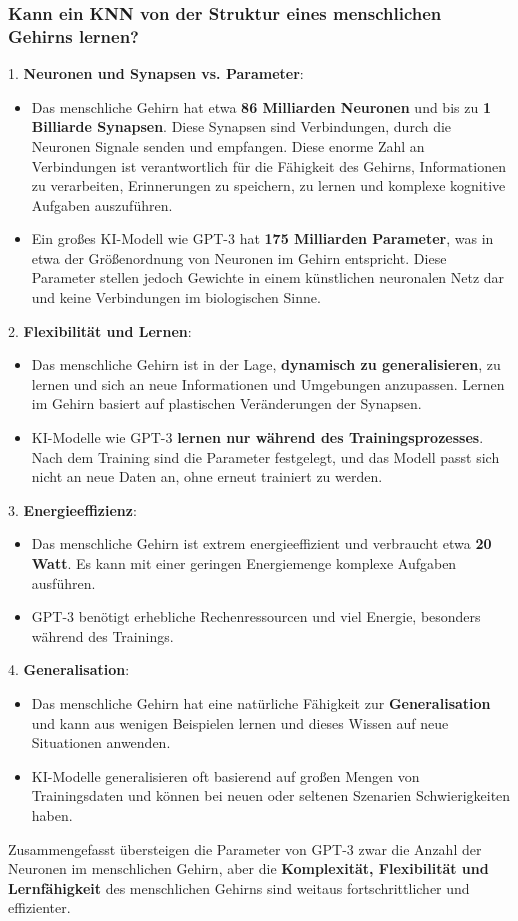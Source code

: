 \documentclass[12pt]{article}
\begin{document}
\subsubsection{Kann ein KNN von der Struktur eines menschlichen Gehirns lernen?} 
1. \textbf{Neuronen und Synapsen vs. Parameter}:
   \begin{itemize}
       \item Das menschliche Gehirn hat etwa \textbf{86 Milliarden Neuronen} und bis zu \textbf{1 Billiarde Synapsen}. Diese Synapsen sind Verbindungen, durch die Neuronen Signale senden und empfangen. Diese enorme Zahl an Verbindungen ist verantwortlich für die Fähigkeit des Gehirns, Informationen zu verarbeiten, Erinnerungen zu speichern, zu lernen und komplexe kognitive Aufgaben auszuführen.
       \item Ein großes KI-Modell wie GPT-3 hat \textbf{175 Milliarden Parameter}, was in etwa der Größenordnung von Neuronen im Gehirn entspricht. Diese Parameter stellen jedoch Gewichte in einem künstlichen neuronalen Netz dar und keine Verbindungen im biologischen Sinne.
   \end{itemize}
%
2. \textbf{Flexibilität und Lernen}:
   \begin{itemize}
       \item Das menschliche Gehirn ist in der Lage, \textbf{dynamisch zu generalisieren}, zu lernen und sich an neue Informationen und Umgebungen anzupassen. Lernen im Gehirn basiert auf plastischen Veränderungen der Synapsen.
       \item KI-Modelle wie GPT-3 \textbf{lernen nur während des Trainingsprozesses}. Nach dem Training sind die Parameter festgelegt, und das Modell passt sich nicht an neue Daten an, ohne erneut trainiert zu werden.
   \end{itemize}
%   
3. \textbf{Energieeffizienz}:
   \begin{itemize}
       \item Das menschliche Gehirn ist extrem energieeffizient und verbraucht etwa \textbf{20 Watt}. Es kann mit einer geringen Energiemenge komplexe Aufgaben ausführen.
       \item GPT-3 benötigt erhebliche Rechenressourcen und viel Energie, besonders während des Trainings.
   \end{itemize}
%   
4. \textbf{Generalisation}:
   \begin{itemize}
       \item Das menschliche Gehirn hat eine natürliche Fähigkeit zur \textbf{Generalisation} und kann aus wenigen Beispielen lernen und dieses Wissen auf neue Situationen anwenden.
       \item KI-Modelle generalisieren oft basierend auf großen Mengen von Trainingsdaten und können bei neuen oder seltenen Szenarien Schwierigkeiten haben.
   \end{itemize}
%
Zusammengefasst übersteigen die Parameter von GPT-3 zwar die Anzahl der Neuronen im menschlichen Gehirn, aber die \textbf{Komplexität, Flexibilität und Lernfähigkeit} des menschlichen Gehirns sind weitaus fortschrittlicher und effizienter.
%
\end{document}
